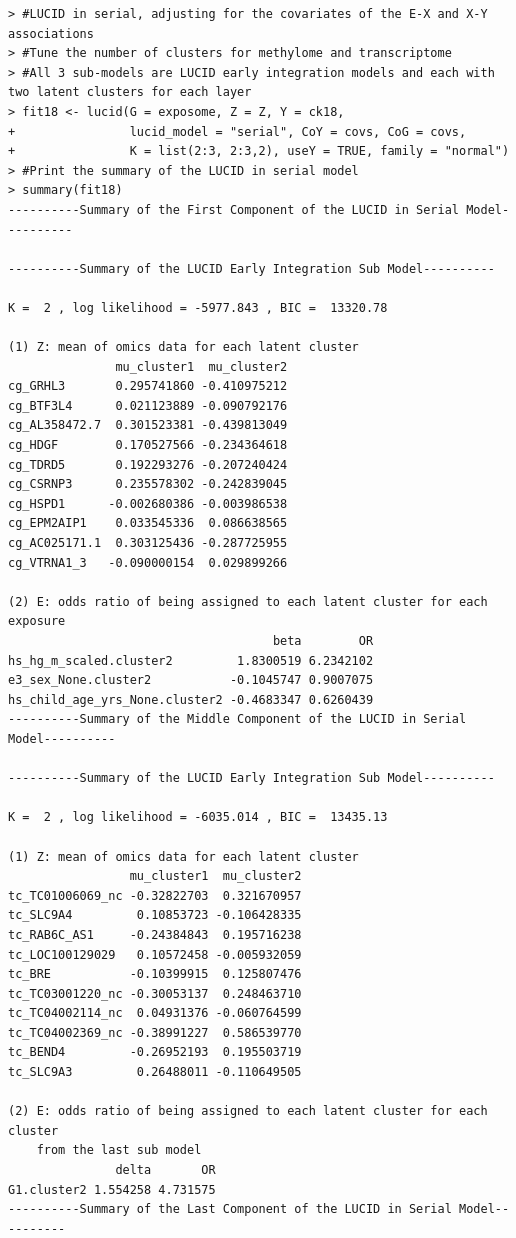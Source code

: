 \begin{verbatim}
> #LUCID in serial, adjusting for the covariates of the E-X and X-Y associations
> #Tune the number of clusters for methylome and transcriptome
> #All 3 sub-models are LUCID early integration models and each with two latent clusters for each layer
> fit18 <- lucid(G = exposome, Z = Z, Y = ck18, 
+                lucid_model = "serial", CoY = covs, CoG = covs, 
+                K = list(2:3, 2:3,2), useY = TRUE, family = "normal")
> #Print the summary of the LUCID in serial model
> summary(fit18)
----------Summary of the First Component of the LUCID in Serial Model---------- 
 
----------Summary of the LUCID Early Integration Sub Model---------- 
 
K =  2 , log likelihood = -5977.843 , BIC =  13320.78 
 
(1) Z: mean of omics data for each latent cluster 
               mu_cluster1  mu_cluster2
cg_GRHL3       0.295741860 -0.410975212
cg_BTF3L4      0.021123889 -0.090792176
cg_AL358472.7  0.301523381 -0.439813049
cg_HDGF        0.170527566 -0.234364618
cg_TDRD5       0.192293276 -0.207240424
cg_CSRNP3      0.235578302 -0.242839045
cg_HSPD1      -0.002680386 -0.003986538
cg_EPM2AIP1    0.033545336  0.086638565
cg_AC025171.1  0.303125436 -0.287725955
cg_VTRNA1_3   -0.090000154  0.029899266

(2) E: odds ratio of being assigned to each latent cluster for each exposure 
                                     beta        OR
hs_hg_m_scaled.cluster2         1.8300519 6.2342102
e3_sex_None.cluster2           -0.1045747 0.9007075
hs_child_age_yrs_None.cluster2 -0.4683347 0.6260439
----------Summary of the Middle Component of the LUCID in Serial Model---------- 
 
----------Summary of the LUCID Early Integration Sub Model---------- 
 
K =  2 , log likelihood = -6035.014 , BIC =  13435.13 
 
(1) Z: mean of omics data for each latent cluster 
                 mu_cluster1  mu_cluster2
tc_TC01006069_nc -0.32822703  0.321670957
tc_SLC9A4         0.10853723 -0.106428335
tc_RAB6C_AS1     -0.24384843  0.195716238
tc_LOC100129029   0.10572458 -0.005932059
tc_BRE           -0.10399915  0.125807476
tc_TC03001220_nc -0.30053137  0.248463710
tc_TC04002114_nc  0.04931376 -0.060764599
tc_TC04002369_nc -0.38991227  0.586539770
tc_BEND4         -0.26952193  0.195503719
tc_SLC9A3         0.26488011 -0.110649505

(2) E: odds ratio of being assigned to each latent cluster for each cluster 
    from the last sub model 
               delta       OR
G1.cluster2 1.554258 4.731575
----------Summary of the Last Component of the LUCID in Serial Model---------- 
 

\end{verbatim}
